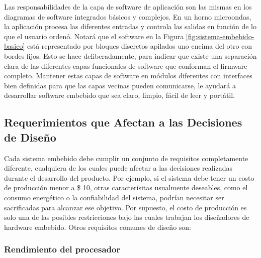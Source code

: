 \documentclass[output=paper, 
colorlinks,
citecolor=brown,
newtxmath
]{langscibook}
\begin{document}
Las responsabilidades de la capa de software de aplicación son las mismas 
en los diagramas de software integrados básicos y complejos. 
En un horno microondas, la aplicación procesa las diferentes entradas 
y controla las salidas en función de lo que el usuario ordenó.
Notará que el software en la Figura \ref{fig:sistema-embebido-basico} está representado por bloques 
discretos apilados uno encima del otro con bordes fijos. Esto se hace deliberadamente, 
para indicar que existe una separación clara de las diferentes capas funcionales 
de software que conforman el firmware completo. 
Mantener estas capas de software en módulos diferentes con interfaces bien definidas para 
que las capas vecinas pueden comunicarse, le ayudará a desarrollar software embebido 
que sea claro, limpio, fácil de leer y portátil.



\subsection {Requerimientos que Afectan a las Decisiones de Diseño}



Cada sistema embebido debe cumplir un conjunto de requisitos completamente 
diferente, cualquiera de los cuales puede afectar a las decisiones realizadas durante el 
desarrollo del producto. Por ejemplo, si el sistema debe tener un costo de producción menor a 
\$ 10, otras caracterísitas usualmente deseables, como el consumo energético o
la confiabilidad del sistema, podrían necesitar ser sacrificadas para alcanzar ese objetivo.
Por supuesto, el costo de producción es solo una de las posibles restricciones 
bajo las cuales trabajan los diseñadores de hardware embebido. Otros requisitos comunes 
de diseño son:



\subsubsection *{Rendimiento del procesador}
\end{document}
